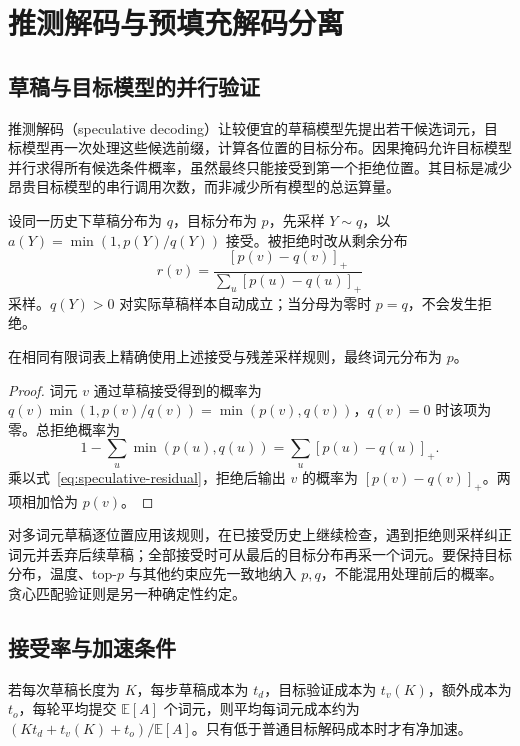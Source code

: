 \setcounter{chapter}{24} %
\chapter{推测解码与预填充解码分离}
\label{ch:speculation}

\section{草稿与目标模型的并行验证}

推测解码（speculative decoding）让较便宜的草稿模型先提出若干候选词元，目标模型再一次处理这些候选前缀，计算各位置的目标分布。因果掩码允许目标模型并行求得所有候选条件概率，虽然最终只能接受到第一个拒绝位置。其目标是减少昂贵目标模型的串行调用次数，而非减少所有模型的总运算量\cite{speculative}。

设同一历史下草稿分布为 $q$，目标分布为 $p$，先采样 $Y\sim q$，以 $a(Y)=\min(1,p(Y)/q(Y))$ 接受。被拒绝时改从剩余分布
\begin{equation}
r(v)=\frac{[p(v)-q(v)]_+}{\sum_u[p(u)-q(u)]_+}
\label{eq:speculative-residual}
\end{equation}
采样。$q(Y)>0$ 对实际草稿样本自动成立；当分母为零时 $p=q$，不会发生拒绝。

\begin{proposition}
\label{prop:speculative-exact}
在相同有限词表上精确使用上述接受与残差采样规则，最终词元分布为 $p$。
\end{proposition}
\begin{proof}
词元 $v$ 通过草稿接受得到的概率为 $q(v)\min(1,p(v)/q(v))=\min(p(v),q(v))$，$q(v)=0$ 时该项为零。总拒绝概率为
\[
1-\sum_u\min(p(u),q(u))=\sum_u[p(u)-q(u)]_+.
\]
乘以式~\eqref{eq:speculative-residual}，拒绝后输出 $v$ 的概率为 $[p(v)-q(v)]_+$。两项相加恰为 $p(v)$。
\end{proof}

对多词元草稿逐位置应用该规则，在已接受历史上继续检查，遇到拒绝则采样纠正词元并丢弃后续草稿；全部接受时可从最后的目标分布再采一个词元。要保持目标分布，温度、top-$p$ 与其他约束应先一致地纳入 $p,q$，不能混用处理前后的概率。贪心匹配验证则是另一种确定性约定。

\section{接受率与加速条件}

若每次草稿长度为 $K$，每步草稿成本为 $t_d$，目标验证成本为 $t_v(K)$，额外成本为 $t_o$，每轮平均提交 $\mathbb E[A]$ 个词元，则平均每词元成本约为 $(Kt_d+t_v(K)+t_o)/\mathbb E[A]$。只有低于普通目标解码成本时才有净加速。

